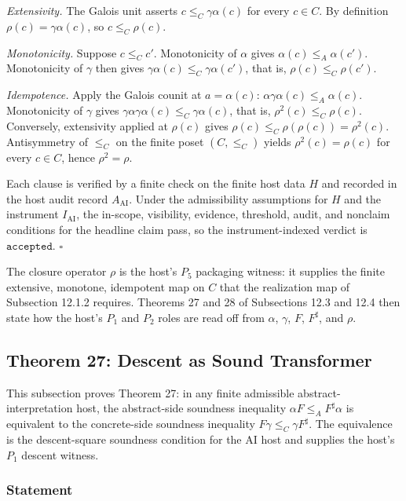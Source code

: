\documentclass[11pt]{article}
\theoremstyle{definition}
\begin{document}
\emph{Extensivity.} The Galois unit asserts \(c\le_C\gamma\alpha(c)\) for every \(c\in C\). By definition \(\rho(c)=\gamma\alpha(c)\), so \(c\le_C\rho(c)\).

\emph{Monotonicity.} Suppose \(c\le_C c'\). Monotonicity of \(\alpha\) gives \(\alpha(c)\le_A\alpha(c')\). Monotonicity of \(\gamma\) then gives \(\gamma\alpha(c)\le_C\gamma\alpha(c')\), that is, \(\rho(c)\le_C\rho(c')\).

\emph{Idempotence.} Apply the Galois counit at \(a=\alpha(c)\): \(\alpha\gamma\alpha(c)\le_A\alpha(c)\). Monotonicity of \(\gamma\) gives \(\gamma\alpha\gamma\alpha(c)\le_C\gamma\alpha(c)\), that is, \(\rho^{2}(c)\le_C\rho(c)\). Conversely, extensivity applied at \(\rho(c)\) gives \(\rho(c)\le_C\rho(\rho(c))=\rho^{2}(c)\). Antisymmetry of \(\le_C\) on the finite poset \((C,\le_C)\) yields \(\rho^{2}(c)=\rho(c)\) for every \(c\in C\), hence \(\rho^{2}=\rho\).

Each clause is verified by a finite check on the finite host data \(H\) and recorded in the host audit record \(A_{\mathrm{AI}}\). Under the admissibility assumptions for \(H\) and the instrument \(I_{\mathrm{AI}}\), the in-scope, visibility, evidence, threshold, audit, and nonclaim conditions for the headline claim pass, so the instrument-indexed verdict is \(\texttt{accepted}\). \(\square\)

The closure operator \(\rho\) is the host's \(P_5\) packaging witness: it supplies the finite extensive, monotone, idempotent map on \(C\) that the realization map of Subsection 12.1.2 requires. Theorems 27 and 28 of Subsections 12.3 and 12.4 then state how the host's \(P_1\) and \(P_2\) roles are read off from \(\alpha\), \(\gamma\), \(F\), \(F^{\sharp}\), and \(\rho\).

\subsection{Theorem 27: Descent as Sound Transformer}

This subsection proves Theorem 27: in any finite admissible abstract-interpretation host, the abstract-side soundness inequality \(\alpha F\le_A F^{\sharp}\alpha\) is equivalent to the concrete-side soundness inequality \(F\gamma\le_C\gamma F^{\sharp}\). The equivalence is the descent-square soundness condition for the AI host and supplies the host's \(P_1\) descent witness.

\subsubsection{Statement}
\end{document}
